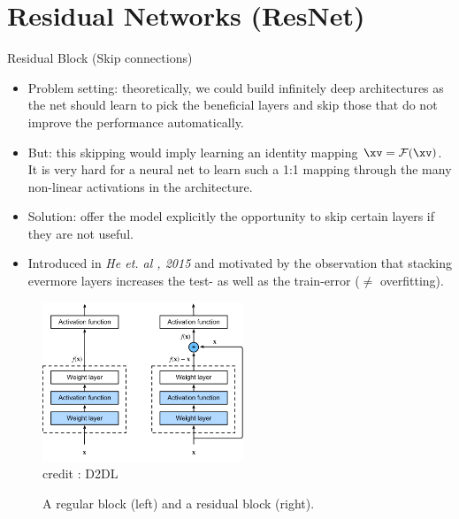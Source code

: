 
\section{Residual Networks (ResNet)}


\begin{vbframe}{Residual Block (Skip connections)}
    \begin{itemize}
        \item Problem setting: theoretically, we could build infinitely deep architectures as the net should learn to pick the beneficial layers and skip those that do not improve the performance automatically.
        \item But: this skipping would imply learning an identity mapping $\xv = \mathcal{F}(\xv)$. It is very hard for a neural net to learn such a 1:1 mapping through the many non-linear activations in the architecture.
        \item Solution: offer the model explicitly the opportunity to skip certain layers if they are not useful.
        \item Introduced in \textit{He et. al , 2015} and motivated by the observation that stacking evermore layers increases the test- as well as the train-error ($\neq$ overfitting).
    \end{itemize}
\framebreak
 
 \begin{figure}
  \centering
    \includegraphics[width=6cm]{plots/moderncnn/residual-block.png}
    \tiny{\\ credit : D2DL}
    \caption{A regular block (left) and a residual block (right).}
  \end{figure}


\end{vbframe}
